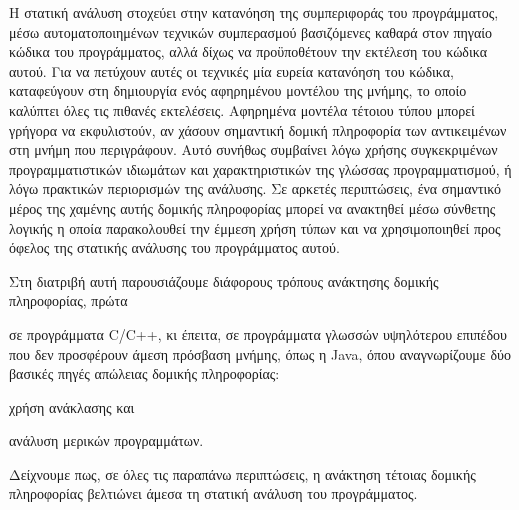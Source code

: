 

Η στατική ανάλυση στοχεύει στην κατανόηση της συμπεριφοράς του
προγράμματος, μέσω αυτοματοποιημένων τεχνικών συμπερασμού βασιζόμενες
καθαρά στον πηγαίο κώδικα του προγράμματος, αλλά δίχως να προϋποθέτουν
την εκτέλεση του κώδικα αυτού. Για να πετύχουν αυτές οι τεχνικές μία
ευρεία κατανόηση του κώδικα, καταφεύγουν στη δημιουργία ενός
αφηρημένου μοντέλου της μνήμης, το οποίο καλύπτει όλες τις πιθανές
εκτελέσεις. Αφηρημένα μοντέλα τέτοιου τύπου μπορεί γρήγορα να
εκφυλιστούν, αν χάσουν σημαντική δομική πληροφορία των αντικειμένων
στη μνήμη που περιγράφουν. Αυτό συνήθως συμβαίνει λόγω χρήσης
συγκεκριμένων προγραμματιστικών ιδιωμάτων και χαρακτηριστικών της
γλώσσας προγραμματισμού, ή λόγω πρακτικών περιορισμών της ανάλυσης.
Σε αρκετές περιπτώσεις, ένα σημαντικό μέρος της χαμένης αυτής δομικής
πληροφορίας μπορεί να ανακτηθεί μέσω σύνθετης λογικής η οποία
παρακολουθεί την έμμεση χρήση τύπων και να χρησιμοποιηθεί προς όφελος
της στατικής ανάλυσης του προγράμματος αυτού.

Στη διατριβή αυτή παρουσιάζουμε διάφορους τρόπους ανάκτησης δομικής
πληροφορίας, πρώτα
\begin{inparaenum}[(1)]
\item σε προγράμματα {\en C/C++}, κι έπειτα, σε προγράμματα γλωσσών
  υψηλότερου επιπέδου που δεν προσφέρουν άμεση πρόσβαση μνήμης, όπως η
  {\en Java}, όπου αναγνωρίζουμε δύο βασικές πηγές απώλειας δομικής
  πληροφορίας:
\item χρήση ανάκλασης και
\item ανάλυση μερικών προγραμμάτων.
\end{inparaenum}
Δείχνουμε πως, σε όλες τις παραπάνω περιπτώσεις, η ανάκτηση τέτοιας
δομικής πληροφορίας βελτιώνει άμεσα τη στατική ανάλυση του
προγράμματος.


